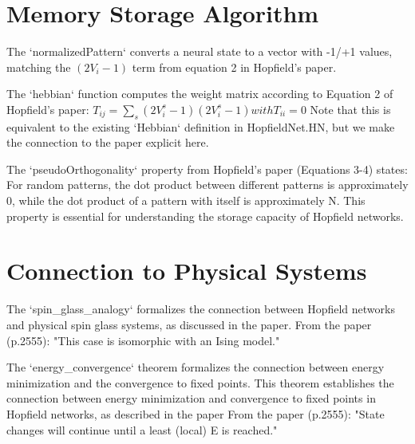 \section{Memory Storage Algorithm}

\begin{definition}\label{normalizedPattern}
\leanok
The `normalizedPattern` converts a neural state to a vector with -1/+1 values,
matching the $(2V_i - 1)$ term from equation 2 in Hopfield's paper.
\end{definition}

\begin{definition}\label{hebbian}
\leanok
The `hebbian` function computes the weight matrix according to Equation 2 of Hopfield's paper:
    $T_{ij} = \sum_{s} (2V_{i}^s - 1)(2V_{i}^s - 1) with T_{ii} = 0$
Note that this is equivalent to the existing `Hebbian` definition in HopfieldNet.HN,
but we make the connection to the paper explicit here.
\end{definition}

\begin{definition}\label{isPseudoOrthogonal}
\leanok
The `pseudoOrthogonality` property from Hopfield's paper (Equations 3-4) states:
For random patterns, the dot product between different patterns is approximately 0,
while the dot product of a pattern with itself is approximately N.
This property is essential for understanding the storage capacity of Hopfield networks.
\end{definition}


\section{Connection to Physical Systems}

\begin{definition}\label{spin_glass_analogy}
The `spin\_glass\_analogy` formalizes the connection between Hopfield networks and
physical spin glass systems, as discussed in the paper.
From the paper (p.2555): "This case is isomorphic with an Ising model."
\end{definition}

\begin{definition}\label{energy_convergence}
The `energy\_convergence` theorem formalizes the connection between energy minimization
and the convergence to fixed points.
This theorem establishes the connection between energy minimization and convergence
to fixed points in Hopfield networks, as described in the paper
From the paper (p.2555): "State changes will continue until a least (local) E is reached."
\end{definition}



